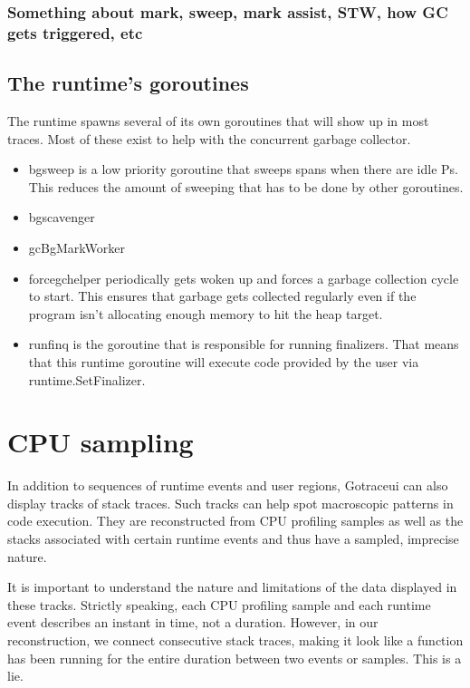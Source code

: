 \documentclass[10pt,letterpaper,oneside,openany,showtrims]{memoir}
\newcommand{\code}[1]{{\ttfamily\mbox{#1}}}
\newcommand{\todo}[1]{{\color{red}#1}}
\begin{document}
\subsection{\todo{Something about mark, sweep, mark assist, STW, how GC gets triggered, etc}}

\section{The runtime's goroutines}
The runtime spawns several of its own goroutines that will show up in most traces.
Most of these exist to help with the concurrent garbage collector.

\begin{itemize}
\item \code{bgsweep} is a low priority goroutine that sweeps spans when there are idle Ps. This reduces the amount
  of sweeping that has to be done by other goroutines.
\item \todo{bgscavenger}
\item \todo{gcBgMarkWorker}
\item \code{forcegchelper} periodically gets woken up and forces a garbage collection cycle to start.
  This ensures that garbage gets collected regularly even if the program isn't allocating enough memory to hit the heap target.
\item \code{runfinq} is the goroutine that is responsible for running finalizers.
  That means that this runtime goroutine will execute code provided by the user via \code{runtime.SetFinalizer}.
\end{itemize}



\chapter{CPU sampling}\label{cpu-sampling}
In addition to sequences of runtime events and user regions, Gotraceui can also display tracks of stack traces.
Such tracks can help spot macroscopic patterns in code execution.
They are reconstructed from CPU profiling samples as well as the stacks associated with certain runtime events and thus have a sampled,
imprecise nature.


It is important to understand the nature and limitations of the data displayed in these tracks.
Strictly speaking, each CPU profiling sample and each runtime event describes an instant in time, not a duration.
However, in our reconstruction, we connect consecutive stack traces,
making it look like a function has been running for the entire duration between two events or samples.
This is a lie.
\end{document}
